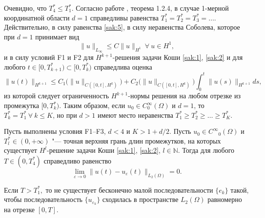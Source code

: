 \begin{remark}[2] Очевидно, что $T_4^*\leq T_1^*$. Согласно работе \cite{Zhidkov}, теорема 1.2.4, в случае 1-мерной координатной области $d=1$ справедливы равенства $T_1^*=T_2^*=T_3^*=\dots$. 
Действительно, в силу равенства \eqref{sak:5}, в силу неравенства Соболева, которое при $d=1$ принимает вид 
$$
\|u\|_{L_{\infty }}\leq C\|u\|_{H^1} \ \forall \ u\in H^1,
$$ 
и в силу условий {\sc F1} и {\sc F2} для $H^{k+1}$-решения задачи Коши \eqref{sak:1}, \eqref{sak:2} и для любого $t\in [0, T_{k+1}^*)\subset [0,T_k^*)$ справедлива оценка 
$$
\|u(t)\|_{H^{k+1}}\leq C_1\bigl(\|u\|_{C([0,t],H^k)}\bigr)+C_2\bigl(\|u\|_{C([0,t],H^k)}\bigr)\int_0^t\| u(s)\| _{H^{k+1}}ds,
$$
из которой следует ограниченность $H^{k+1}$-нормы решения на любом отрезке из промежутка $[0,T^*_k)$.
Таким образом, если $u_0\in C^{\infty }_0(\Omega )$ и $d=1$, то $T_k^*=T_1^*\ \forall \ k\leq K$, но при $d>1$ имеют место неравенства $T_1^*\geq T_2^*\geq \dots \geq T_K^*$.
\end{remark}

\smallskip


\begin{theorem}[5]Пусть выполнены условия {\sc F1--F3,} $d<4$ и $K>1+{d/2}.$ Пусть $u_{0}\in {C^{\infty }}_{0}(\Omega )$ и
$T_{l}^*\in (0,+\infty )$ "--- точная верхняя грань длин промежутков{\rm ,}
на которых существует $H^l$-решение задачи Коши \eqref{sak:1}{\rm ,} \eqref{sak:2}{\rm ,} $l\in \mathbb N.$ Тогда для
любого $T\in (0,T_{4}^*)$ справедливо равенство
$$\lim\limits_{\varepsilon\to 0}\| u(t)-u_{\varepsilon}(t)\| _{L_2(\Omega )}=0.$$ 

Если $T>T_1^*,$ то не существует бесконечно малой последовательности $\{ e_k\}$ такой, чтобы последовательность $\{ u_{\varepsilon _k}\}$ сходилась в пространстве $L_2(\Omega )$ равномерно на отрезке $[0,T].$
\end{theorem}

\smallskip

